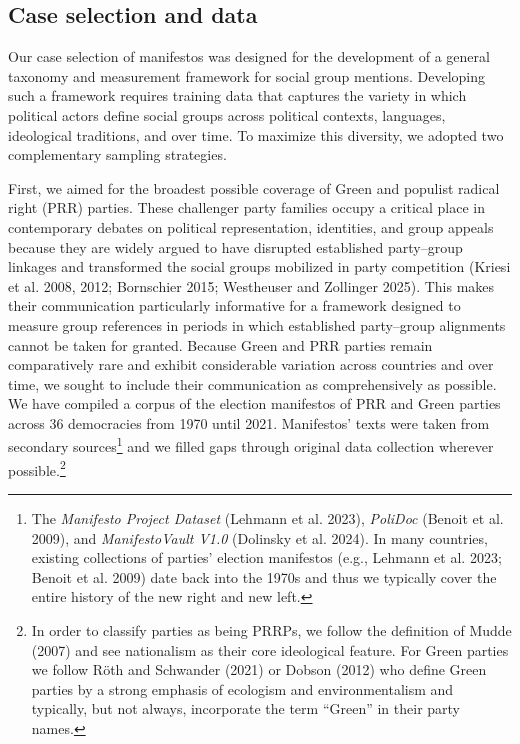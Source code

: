 \documentclass[12pt]{article}
\begin{document}
\subsection{Case selection and data}\label{case-selection-and-data}

Our case selection of manifestos was designed for the development of a general taxonomy and measurement framework for social group mentions.
Developing such a framework requires training data that captures the variety in which political actors define social groups across political contexts, languages, ideological traditions, and over time.
To maximize this diversity, we adopted two complementary sampling strategies.



First, we aimed for the broadest possible coverage of Green and populist radical right (PRR) parties.
These challenger party families occupy a critical place in contemporary debates on political representation, identities, and group appeals because they are widely argued to have disrupted established party--group linkages and transformed the social groups mobilized in party competition (Kriesi et al. 2008, 2012; Bornschier 2015; Westheuser and Zollinger 2025).
This makes their communication particularly informative for a framework designed to measure group references in periods in which established party--group alignments cannot be taken for granted.
Because Green and PRR parties remain comparatively rare and exhibit considerable variation across countries and over time, we sought to include their communication as comprehensively as possible.
We have compiled a corpus of the election manifestos of PRR and Green parties across 36 democracies from 1970 until 2021.
Manifestos' texts were taken from secondary sources\footnote{The \emph{Manifesto Project Dataset} (Lehmann et al. 2023), \emph{PoliDoc} (Benoit et al. 2009), and \emph{ManifestoVault V1.0} (Dolinsky et al. 2024).
  In many countries, existing collections of parties' election manifestos (e.g., Lehmann et al. 2023; Benoit et al. 2009) date back into the 1970s and thus we typically cover the entire history of the new right and new left.} and we filled gaps through original data collection wherever possible.\footnote{In order to classify parties as being PRRPs, we follow the definition of Mudde (2007) and see nationalism as their core ideological feature.
  For Green parties we follow Röth and Schwander (2021) or Dobson (2012) who define Green parties by a strong emphasis of ecologism and environmentalism and typically, but not always, incorporate the term ``Green'' in their party names.}
\end{document}
